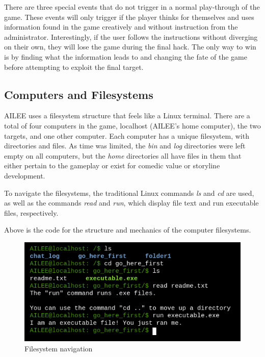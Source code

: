 \documentclass[conference]{IEEEtran}
\begin{document}
There are three special events that do not trigger in a normal play-through of the game. These events will only trigger if the player thinks for themselves and uses information found in the game creatively and without instruction from the administrator. Interestingly, if the user follows the instructions without diverging on their own, they will lose the game during the final hack. The only way to win is by finding what the information leads to and changing the fate of the game before attempting to exploit the final target.

\subsection{Computers and Filesystems}
AILEE uses a filesystem structure that feels like a Linux terminal. There are a total of four computers in the game, localhost (AILEE's home computer), the two targets, and one other computer. Each computer has a unique filesystem, with directories and files. As time was limited, the \textit{bin} and \textit{log} directories were left empty on all computers, but the \textit{home} directories all have files in them that either pertain to the gameplay or exist for comedic value or storyline development.

To navigate the filesystems, the traditional Linux commands \textit{ls} and \textit{cd} are used, as well as the commands \textit{read} and \textit{run}, which display file text and run executable files, respectively. 



Above is the code for the structure and mechanics of the computer filesystems. 


\begin{figure}[htbp]
	\centerline{\includegraphics[scale=2]{filesystem-example}}
	\caption{Filesystem navigation}
	\label{fig:ls-command}
\end{figure}
\end{document}
